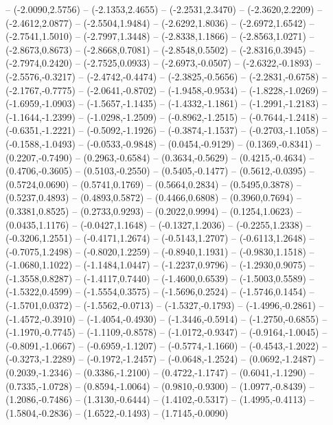 {	-- (-2.0090,2.5756)
	-- (-2.1353,2.4655)
	-- (-2.2531,2.3470)
	-- (-2.3620,2.2209)
	-- (-2.4612,2.0877)
	-- (-2.5504,1.9484)
	-- (-2.6292,1.8036)
	-- (-2.6972,1.6542)
	-- (-2.7541,1.5010)
	-- (-2.7997,1.3448)
	-- (-2.8338,1.1866)
	-- (-2.8563,1.0271)
	-- (-2.8673,0.8673)
	-- (-2.8668,0.7081)
	-- (-2.8548,0.5502)
	-- (-2.8316,0.3945)
	-- (-2.7974,0.2420)
	-- (-2.7525,0.0933)
	-- (-2.6973,-0.0507)
	-- (-2.6322,-0.1893)
	-- (-2.5576,-0.3217)
	-- (-2.4742,-0.4474)
	-- (-2.3825,-0.5656)
	-- (-2.2831,-0.6758)
	-- (-2.1767,-0.7775)
	-- (-2.0641,-0.8702)
	-- (-1.9458,-0.9534)
	-- (-1.8228,-1.0269)
	-- (-1.6959,-1.0903)
	-- (-1.5657,-1.1435)
	-- (-1.4332,-1.1861)
	-- (-1.2991,-1.2183)
	-- (-1.1644,-1.2399)
	-- (-1.0298,-1.2509)
	-- (-0.8962,-1.2515)
	-- (-0.7644,-1.2418)
	-- (-0.6351,-1.2221)
	-- (-0.5092,-1.1926)
	-- (-0.3874,-1.1537)
	-- (-0.2703,-1.1058)
	-- (-0.1588,-1.0493)
	-- (-0.0533,-0.9848)
	-- (0.0454,-0.9129)
	-- (0.1369,-0.8341)
	-- (0.2207,-0.7490)
	-- (0.2963,-0.6584)
	-- (0.3634,-0.5629)
	-- (0.4215,-0.4634)
	-- (0.4706,-0.3605)
	-- (0.5103,-0.2550)
	-- (0.5405,-0.1477)
	-- (0.5612,-0.0395)
	-- (0.5724,0.0690)
	-- (0.5741,0.1769)
	-- (0.5664,0.2834)
	-- (0.5495,0.3878)
	-- (0.5237,0.4893)
	-- (0.4893,0.5872)
	-- (0.4466,0.6808)
	-- (0.3960,0.7694)
	-- (0.3381,0.8525)
	-- (0.2733,0.9293)
	-- (0.2022,0.9994)
	-- (0.1254,1.0623)
	-- (0.0435,1.1176)
	-- (-0.0427,1.1648)
	-- (-0.1327,1.2036)
	-- (-0.2255,1.2338)
	-- (-0.3206,1.2551)
	-- (-0.4171,1.2674)
	-- (-0.5143,1.2707)
	-- (-0.6113,1.2648)
	-- (-0.7075,1.2498)
	-- (-0.8020,1.2259)
	-- (-0.8940,1.1931)
	-- (-0.9830,1.1518)
	-- (-1.0680,1.1022)
	-- (-1.1484,1.0447)
	-- (-1.2237,0.9796)
	-- (-1.2930,0.9075)
	-- (-1.3558,0.8287)
	-- (-1.4117,0.7440)
	-- (-1.4600,0.6539)
	-- (-1.5003,0.5589)
	-- (-1.5322,0.4599)
	-- (-1.5554,0.3575)
	-- (-1.5696,0.2524)
	-- (-1.5746,0.1454)
	-- (-1.5701,0.0372)
	-- (-1.5562,-0.0713)
	-- (-1.5327,-0.1793)
	-- (-1.4996,-0.2861)
	-- (-1.4572,-0.3910)
	-- (-1.4054,-0.4930)
	-- (-1.3446,-0.5914)
	-- (-1.2750,-0.6855)
	-- (-1.1970,-0.7745)
	-- (-1.1109,-0.8578)
	-- (-1.0172,-0.9347)
	-- (-0.9164,-1.0045)
	-- (-0.8091,-1.0667)
	-- (-0.6959,-1.1207)
	-- (-0.5774,-1.1660)
	-- (-0.4543,-1.2022)
	-- (-0.3273,-1.2289)
	-- (-0.1972,-1.2457)
	-- (-0.0648,-1.2524)
	-- (0.0692,-1.2487)
	-- (0.2039,-1.2346)
	-- (0.3386,-1.2100)
	-- (0.4722,-1.1747)
	-- (0.6041,-1.1290)
	-- (0.7335,-1.0728)
	-- (0.8594,-1.0064)
	-- (0.9810,-0.9300)
	-- (1.0977,-0.8439)
	-- (1.2086,-0.7486)
	-- (1.3130,-0.6444)
	-- (1.4102,-0.5317)
	-- (1.4995,-0.4113)
	-- (1.5804,-0.2836)
	-- (1.6522,-0.1493)
	-- (1.7145,-0.0090)
}
